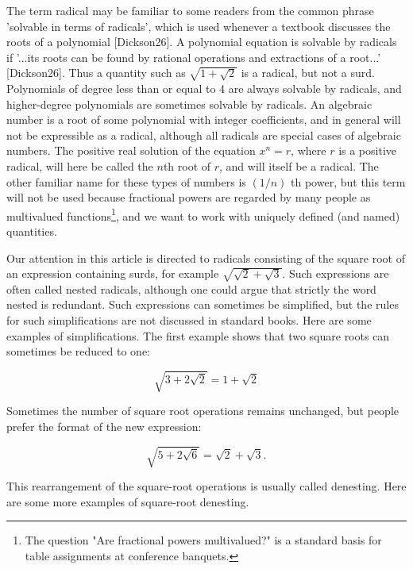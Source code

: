 \documentclass[11pt,letterpaper]{article}
\begin{document}
The term radical may be familiar to some readers from the common phrase 'solvable in terms of radicals', which is used whenever a textbook discusses the roots of a polynomial [Dickson26]. A polynomial equation is solvable by radicals if '...its roots can be found by rational operations and extractions of a root...' [Dickson26]. Thus a quantity such as $\sqrt{1+\sqrt{2}}$ is a radical, but not a surd. Polynomials of degree less than or equal to 4 are always solvable by radicals, and higher-degree polynomials are sometimes solvable by radicals. An algebraic number is a root of some polynomial with integer coefficients, and in general will not be expressible as a radical, although all radicals are special cases of algebraic numbers. The positive real solution of the equation $x^{n}=r$, where $r$ is a positive radical, will here be called the $n$th root of $r$, and will itself be a radical. The other familiar name for these types of numbers is $(1 / n)$ th power, but this term will not be used because fractional powers are regarded by many people as multivalued functions\footnote{The question "Are fractional powers multivalued?" is a standard basis for table assignments at conference banquets.}, and we want to work with uniquely defined (and named) quantities.

Our attention in this article is directed to radicals consisting of the square root of an expression containing surds, for example $\sqrt{\sqrt{2}+\sqrt{3}}$. Such expressions are often called nested radicals, although one could argue that strictly the word nested is redundant. Such expressions can sometimes be simplified, but the rules for such simplifications are not discussed in standard books. Here are some examples of simplifications. The first example shows that two square roots can sometimes be reduced to one:


\begin{equation*}
\sqrt{3+2 \sqrt{2}}=1+\sqrt{2} \tag{4.1}\label{eq:4.1}
\end{equation*}


Sometimes the number of square root operations remains unchanged, but people prefer the format of the new expression:


\begin{equation*}
\sqrt{5+2 \sqrt{6}}=\sqrt{2}+\sqrt{3} . \tag{4.2}\label{eq:4.2}
\end{equation*}


This rearrangement of the square-root operations is usually called denesting. Here are some more examples of square-root denesting.
\end{document}
